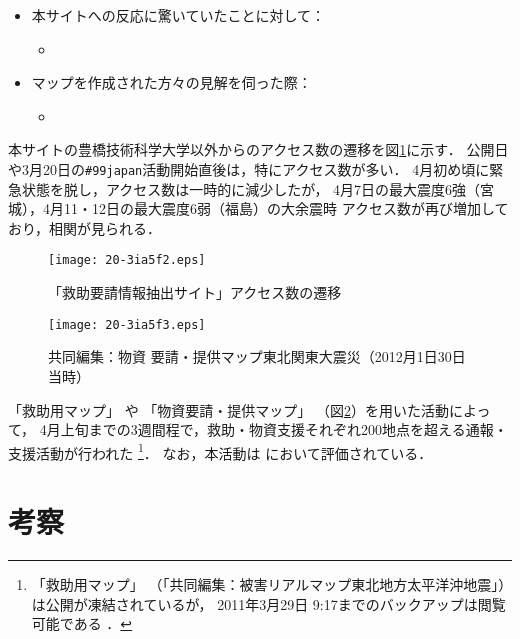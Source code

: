 \documentclass[japanese]{jnlp_1.4}
\newcommand{\twitter}[3]{}
\begin{document}
\begin{itemize}
\begin{itemize}
  {ma\_chiman}
  \end{itemize}
\item 本サイトへの反応に驚いていたことに対して：
  \begin{itemize}
  \item \twitter{@aidashin 今，一番有用に使わせてもらってます！ありがとうございます！\mbox{\rm \cite{juntaro33_1}}}
  {2011/4/2 16:16:24}
  {\mbox{juntaro33}}
  \end{itemize}
\item 
  マップを作成された方々の見解を伺った際：
  \begin{itemize}
  \item \twitter{@aidashin いえいえ．今，マップの情報のほとんどがあいださんのシステムからの情報ですから．
      \mbox{\rm \cite{juntaro33_2}}}
    {2011/4/6 23:52:14}{\mbox{juntaro33}}
  \end{itemize}
\end{itemize}

本サイトの豊橋技術科学大学以外からのアクセス数の遷移を図\ref{log}に示す．
公開日や3月20日の{\tt \#99japan}活動開始直後は，特にアクセス数が多い．
4月初め頃に緊急状態を脱し，アクセス数は一時的に減少したが，
4月7日の最大震度6強（宮城），4月11・12日の最大震度6弱（福島）の大余震時
アクセス数が再び増加しており，相関が見られる．

\begin{figure}[b]
  \begin{center}
    \texttt{[image: 20-3ia5f2.eps]}
  \end{center}
  \caption{「救助要請情報抽出サイト」アクセス数の遷移}
  \label{log}
\end{figure}
\begin{figure}[b]
  \begin{center}
    \texttt{[image: 20-3ia5f3.eps]}
  \end{center}
  \caption{共同編集：物資 要請・提供マップ東北関東大震災（2012月1日30日当時）}
  \label{map}
\end{figure}


「救助用マップ」
や
「物資要請・提供マップ」
（図\ref{map}）を用いた活動によって，
4月上旬までの3週間程で，救助・物資支援それぞれ200地点を超える通報・支援活動が行われた
\footnote{「救助用マップ」
（「共同編集：被害リアルマップ東北地方太平洋沖地震」）は公開が凍結されているが，
2011年3月29日 9:17までのバックアップは閲覧可能である \cite{map1_backup}．}．
なお，本活動は \cite{Utada} において評価されている．


\section{考察}
\end{document}

